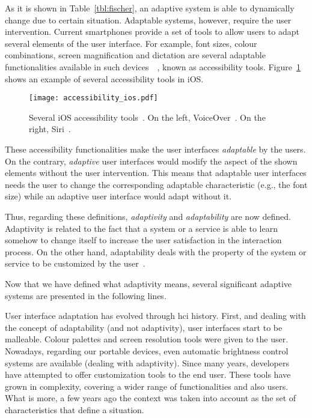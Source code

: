 As it is shown in Table~\ref{tbl:fischer}, an adaptive system is able to 
dynamically change due to certain situation. Adaptable systems, however, require 
the user intervention. Current smartphones provide a set of tools to allow users
to adapt several elements of the user interface. For example, font sizes, colour 
combinations, screen magnification and dictation are several adaptable 
functionalities available in such devices~\citep{android_accessibility}~\citep{ios_accessibility},
known as accessibility tools. Figure~\ref{fig:accessibility_ios} shows an example 
of several accessibility tools in iOS.

\begin{figure}
\centering
\texttt{[image: accessibility\_ios.pdf]}
\caption{Several iOS accessibility tools~\citep{ios_accessibility}. On the left, 
VoiceOver~\citep{ios_voiceover}. On the right, Siri~\citep{ios_siri}.}
\label{fig:accessibility_ios}
\end{figure}

These accessibility functionalities make the user interfaces \textit{adaptable}
by the users. On the contrary, \textit{adaptive} user interfaces would modify 
the aspect of the shown elements without the user intervention. This means that 
adaptable user interfaces needs the user to change the corresponding adaptable 
characteristic (e.g., the font size) while an adaptive user interface would 
adapt without it.

Thus, regarding these definitions, \textit{adaptivity} and \textit{adaptability}
are now defined. Adaptivity is related to the fact that a system or a service is
able to learn somehow to change itself to increase the user satisfaction in the
interaction process. On the other hand, adaptability deals with the property of
the system or service to be customized by the user~\citep{jameson_modelling_2001}.

Now that we have defined what adaptivity means, several significant adaptive 
systems are presented in the following lines.

User interface adaptation has evolved through \ac{hci} history. First, and dealing with
the concept of adaptability (and not adaptivity), user interfaces start to be malleable. 
Colour palettes and screen resolution tools were given to the user. Nowadays, regarding
our portable devices, even automatic brightness control systems are available (dealing
with adaptivity). Since many years, developers have attempted to offer customization
tools to the end user. These tools have grown in complexity, covering a wider range of
functionalities and also users. What is more, a few years ago the context was taken
into account as the set of characteristics that define a situation.

